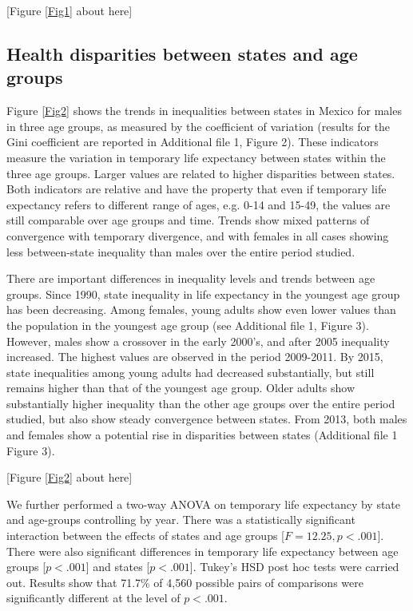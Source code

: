 \documentclass{bmcart}
\begin{document}
\begin{center}
[Figure \ref{Fig1} about here]
\end{center}

\subsection*{Health disparities between states and age groups}
Figure \ref{Fig2} shows the trends in inequalities between states in Mexico for males in three age groups, as measured by the coefficient of variation (results for the Gini coefficient are reported in Additional file 1, Figure 2). These indicators measure the variation in temporary life expectancy between states within the three age groups. Larger values are related to higher disparities between states. Both indicators are relative and have the property that even if temporary life expectancy refers to different range of ages, e.g. 0-14 and 15-49, the values are still comparable over age groups and time. Trends show mixed patterns of convergence with temporary divergence, and with females in all cases showing less between-state inequality than males over the entire period studied. 

There are important differences in inequality levels and trends between age groups. Since 1990, state inequality in life expectancy in the youngest age group has been decreasing. Among females, young adults show even lower values than the population in the youngest age group (see Additional file 1, Figure 3). However, males show a crossover in the early 2000's, and after 2005 inequality increased. The highest values are observed in the period 2009-2011. By 2015, state inequalities among young adults had decreased substantially, but still remains higher than that of the youngest age group. Older adults show substantially higher inequality than the other age groups over the entire period studied, but also show steady convergence between states. From 2013, both males and females show a potential rise in disparities between states (Additional file 1 Figure 3).  \\

\begin{center}
[Figure \ref{Fig2} about here]
\end{center}


We further performed a two-way ANOVA on temporary life expectancy by state and age-groups controlling by year. There was a statistically significant interaction between the effects of states and age groups [$F=12.25, p < .001$]. There were also significant differences in temporary life expectancy between age groups [$p < .001$] and states [$p < .001$]. Tukey's HSD post hoc tests were carried out. Results show that 71.7\% of 4,560 possible pairs of comparisons were significantly different at the level of $p < .001$. 
\end{document}
